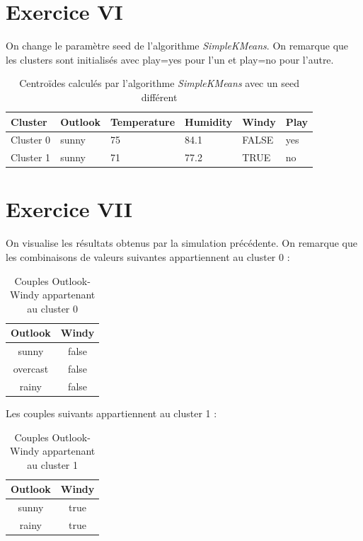\documentclass[a4paper, 11pt]{report}
\begin{document}
        \section{Exercice VI}
        On change le paramètre seed de l'algorithme \emph{SimpleKMeans}. On remarque que les clusters sont initialisés avec play=yes pour l'un et play=no pour l'autre.
        \begin{table}[h!]
        \centering
        \begin{tabular}{| l | l | l | l | l | l |}
        \hline
        Cluster & Outlook & Temperature & Humidity & Windy & Play \\
        \hline
        Cluster 0 & sunny & 75 & 84.1 & FALSE & yes \\
        \hline
        Cluster 1 & sunny & 71 & 77.2 & TRUE & no \\
        \hline

        \end{tabular}
        \caption{Centroïdes calculés par l'algorithme \emph{SimpleKMeans} avec un seed différent}
        \label{tab:exo_6}
        \end{table}
        
        \section{Exercice VII}
        On visualise les résultats obtenus par la simulation précédente. On remarque que les combinaisons de valeurs suivantes appartiennent au cluster 0 :
        \begin{table}[h!]
        \centering
        \begin{tabular}{| c | c |}
         \hline
         Outlook & Windy \\
         \hline
         sunny & false \\
         overcast & false \\
         rainy & false \\
         \hline
        
        \end{tabular}
        \caption{Couples Outlook-Windy appartenant au cluster 0}
        \label{tab:exo7_1}
        \end{table}
        
        Les couples suivants appartiennent au cluster 1 : 
        \begin{table}[h!]
        \centering
        \begin{tabular}{| c | c |}
         \hline
         Outlook & Windy \\
         \hline
         sunny & true \\
         rainy & true \\
         \hline
        
        \end{tabular}
        \caption{Couples Outlook-Windy appartenant au cluster 1}
        \label{tab:exo7_2}
        \end{table}
\end{document}
